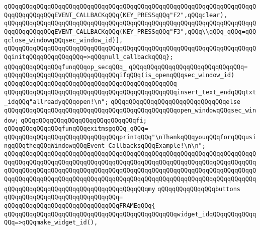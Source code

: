 \verb|qQQqqQQqqQQqqQQqqQQqqQQqqQQqqQQqqQQqqQQqqQQqqQQqqQQqqQQqqQQqqQQqqQQqqQQqqQQqqQQqqQQqEVENT_CALLBACKqQQq(KEY_PRESSqQQq"F2",qQQqclear),|\newline
\verb|qQQqqQQqqQQqqQQqqQQqqQQqqQQqqQQqqQQqqQQqqQQqqQQqqQQqqQQqqQQqqQQqqQQqqQQqqQQqqQQqqQQqEVENT_CALLBACKqQQq(KEY_PRESSqQQq"F3",qQQq\\qQQq_qQQq=qQQqclose_windowqQQqsec_window_id)],|\newline
\verb|qQQqqQQqqQQqqQQqqQQqqQQqqQQqqQQqqQQqqQQqqQQqqQQqqQQqqQQqqQQqqQQqqQQqqQQqinitqQQqqQQqqQQqqQQq=>qQQqnull_callbackqQQq};|\newline
\newline
\verb|qQQqqQQqqQQqqQQqfunqQQqop_secqQQq_|\newline
\verb|qQQqqQQqqQQqqQQqqQQqqQQqqQQqqQQq=|\newline
\verb|qQQqqQQqqQQqqQQqqQQqqQQqqQQqqQQqifqQQq(is_openqQQqsec_window_id)|\newline
\verb|qQQqqQQqqQQqqQQqqQQqqQQqqQQqqQQqqQQqqQQqqQQqqQQq|\newline
\verb|qQQqqQQqqQQqqQQqqQQqqQQqqQQqqQQqqQQqqQQqqQQqqQQqinsert_text_endqQQqtxt_idqQQq"allreadyqQQqopen!\n";|\newline
\verb|qQQqqQQqqQQqqQQqqQQqqQQqqQQqqQQqelse|\newline
\verb|qQQqqQQqqQQqqQQqqQQqqQQqqQQqqQQqqQQqqQQqqQQqqQQqopen_windowqQQqsec_window;|\newline
\verb|qQQqqQQqqQQqqQQqqQQqqQQqqQQqqQQqfi;|\newline
\newline
\verb|qQQqqQQqqQQqqQQqfunqQQqexitmsgqQQq_qQQq=|\newline
\verb|qQQqqQQqqQQqqQQqqQQqqQQqqQQqqQQqprintqQQq"\nThankqQQqyouqQQqforqQQqusingqQQqtheqQQqWindowqQQqEvent_CallbacksqQQqExample!\n\n";|\newline
\newline
\verb|qQQqqQQqqQQqqQQqqQQqqQQqqQQqqQQqqQQqqQQqqQQqqQQqqQQqqQQqqQQqqQQqqQQqqQQqqQQqqQQqqQQqqQQqqQQqqQQqqQQqqQQqqQQqqQQqqQQqqQQqqQQqqQQqqQQqqQQqqQQqqQQqqQQqqQQqqQQqqQQqqQQqqQQqqQQqqQQqqQQqqQQqqQQqqQQqqQQqqQQqqQQqqQQqqQQqqQQqqQQqqQQqqQQqqQQqqQQqqQQqqQQqqQQqqQQqqQQqqQQqqQQqqQQqqQQqqQQqqQQqqQQqqQQqqQQqqQQqqQQqqQQqqQQqqQQqqQQqqQQqmy|\newline
\verb|qQQqqQQqqQQqqQQqbuttons|\newline
\verb|qQQqqQQqqQQqqQQqqQQqqQQqqQQqqQQq=|\newline
\verb|qQQqqQQqqQQqqQQqqQQqqQQqqQQqqQQqFRAMEqQQq{|\newline
\verb|qQQqqQQqqQQqqQQqqQQqqQQqqQQqqQQqqQQqqQQqqQQqqQQqwidget_idqQQqqQQqqQQqqQQq=>qQQqmake_widget_id(),|\newline
